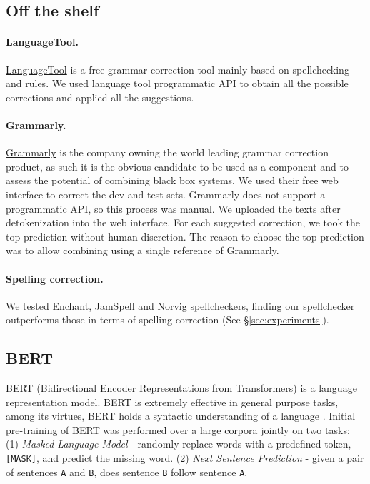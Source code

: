 \documentclass[11pt,a4paper]{article}
\begin{document}
\subsection{Off the shelf}
\paragraph{LanguageTool.}
\href{https://github.com/languagetool-org/languagetool}{LanguageTool} is a free grammar correction tool mainly based on spellchecking and rules.  We used language tool programmatic API to obtain all the possible corrections and applied all the suggestions.
\paragraph{Grammarly.} 
\href{https://www.grammarly.com/}{Grammarly} is the company owning the world leading grammar correction product, as such it is the obvious candidate to be used as a component and to assess the potential of combining black box systems. We used their free web interface to correct the dev and test sets.  Grammarly does not support a programmatic API, so this process was manual.  We uploaded the texts after detokenization into the web interface.   For each suggested correction, we took the top prediction without human discretion. The reason to choose the top prediction was to allow combining using a single reference of Grammarly.
\paragraph{Spelling correction.}
We tested \href{https://www.abisource.com/projects/enchant/}{Enchant},  \href{https://github.com/bakwc/JamSpell}{JamSpell} and \href{https://github.com/barrust/pyspellchecker}{Norvig} spellcheckers, finding our spellchecker outperforms those in terms of spelling correction (See \S \ref{sec:experiments}).
\subsection{BERT} \label{subsec:bert}
BERT (Bidirectional Encoder Representations from Transformers) \cite{devlin2018bert} is a language representation model. BERT is extremely effective in general purpose tasks, among its virtues, BERT holds a syntactic understanding of a language \cite{DBLP:journals/corr/abs-1901-05287}. Initial pre-training of BERT was performed over a large corpora jointly on two tasks: (1) \textit{Masked Language Model} - randomly replace words with a predefined token, \verb|[MASK]|, and predict the missing word. (2) \textit{Next Sentence Prediction} - given a pair of sentences \verb|A| and \verb|B|, does sentence \verb|B| follow sentence \verb|A|.
\end{document}
